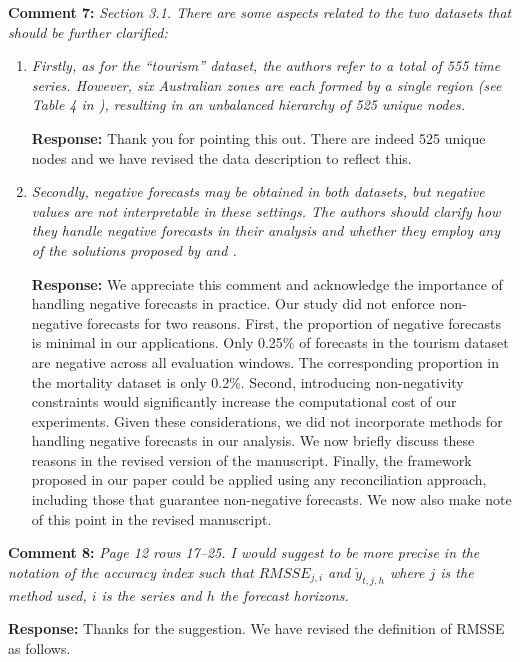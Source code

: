 \documentclass{article}
\numberwithin{equation}{section}
\theoremstyle{plain}
\theoremstyle{definition}
\theoremstyle{remark}
\begin{document}
\textbf{Comment 7:} \textit{Section 3.1. There are some aspects related to the two datasets that should be further clarified:}
\begin{enumerate}
    \item \textit{Firstly, as for the ``tourism'' dataset, the authors refer to a total of 555 time series. However, six Australian zones are each formed by a single region (see Table 4 in \citealp{girolimettoCrosstemporalProbabilisticForecast2023a}), resulting in an unbalanced hierarchy of 525 unique nodes.}

    \noindent \textbf{Response:} {Thank you for pointing this out. There are indeed 525 unique nodes and we have revised the data description to reflect this. }
    \item \textit{Secondly, negative forecasts may be obtained in both datasets, but negative values are not interpretable in these settings. The authors should clarify how they handle negative forecasts in their analysis and whether they employ any of the solutions proposed by \cite{wickramasuriya2020optimal} and \cite{di2023spatio}.}

    \noindent \textbf{Response:} 
    {We appreciate this comment and acknowledge the importance of handling negative forecasts in practice. Our study did not enforce non-negative forecasts for two reasons. First, the proportion of negative forecasts is minimal in our applications. Only 0.25\% of forecasts in the tourism dataset are negative across all evaluation windows. The corresponding proportion in the mortality dataset is only 0.2\%. Second, introducing non-negativity constraints would significantly increase the computational cost of our experiments. Given these considerations, we did not incorporate methods for handling negative forecasts in our analysis. We now briefly discuss these reasons in the revised version of the manuscript. Finally, the framework proposed in our paper could be applied using any reconciliation approach, including those that guarantee non-negative forecasts. We now also make note of this point in the revised manuscript. }
\end{enumerate}

\medskip
\textbf{Comment 8:} \textit{Page 12 rows 17--25. I would suggest to be more precise in the notation of the accuracy index such that $RMSSE_{j,i}$ and $\check{y}_{t,j,h}$ where $j$ is the method used, $i$ is the series and $h$ the forecast horizons.}

\medskip

\noindent \textbf{Response:} {Thanks for the suggestion. We have revised the definition of RMSSE as follows.}
\end{document}
